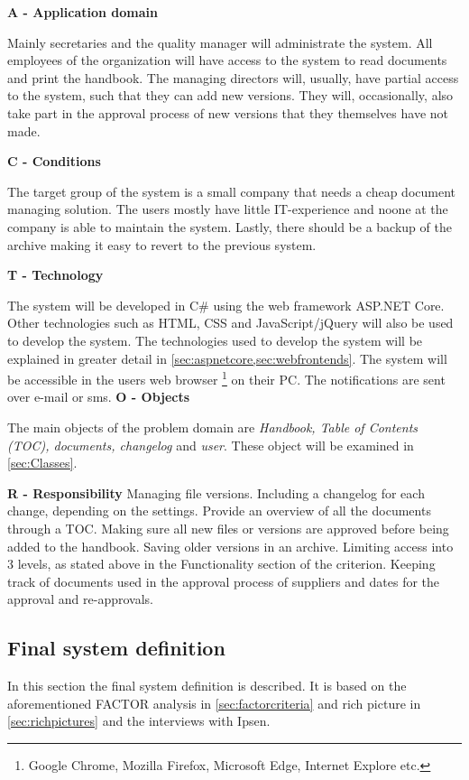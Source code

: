 \textbf{A - Application domain}

Mainly secretaries and the quality manager will administrate the system.
All employees of the organization will have access to the system to read documents and print the handbook.
The managing directors will, usually, have partial access to the system, such that they can add new versions.
They will, occasionally, also take part in the approval process of new versions that they themselves have not made.

\textbf{C - Conditions} \label{sec:conditions}

The target group of the system is a small company that needs a cheap document managing solution.
The users mostly have little IT-experience and noone at the company is able to maintain the system.
Lastly, there should be a backup of the archive making it easy to revert to the previous system.

\textbf{T - Technology}

The system will be developed in C\# using the web framework ASP.NET Core.
Other technologies such as HTML, CSS and JavaScript/jQuery will also be used to develop the system.
The technologies used to develop the system will be explained in greater detail in \cref{sec:aspnetcore,sec:webfrontends}.
The system will be accessible in the users web browser \footnote{Google Chrome, Mozilla Firefox, Microsoft Edge, Internet Explore etc.} on their PC.
The notifications are sent over e-mail or sms.
\textbf{O - Objects}

The main objects of the problem domain are \textit{Handbook, Table of Contents (TOC), documents, changelog} and \textit{user}.
These object will be examined in \cref{sec:Classes}.

\textbf{R  - Responsibility}
Managing file versions.
Including a changelog for each change, depending on the settings.
Provide an overview of all the documents through a TOC.
Making sure all new files or versions are approved before being added to the handbook.
Saving older versions in an archive.
Limiting access into 3 levels, as stated above in the Functionality section of the criterion.
Keeping track of documents used in the approval process of suppliers and dates for the approval and re-approvals.

\subsection{Final system definition}\label{sec:systemdefinition}
In this section the final system definition is described.
It is based on the aforementioned FACTOR analysis in \cref{sec:factorcriteria} and rich picture in \cref{sec:richpictures} and the interviews with Ipsen.

